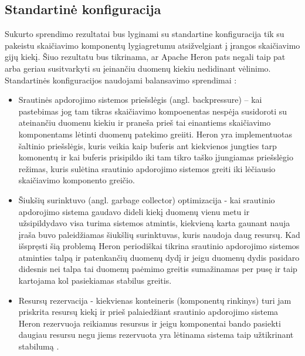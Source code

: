 \documentclass{VUMIFPSbakalaurinis}
\begin{document}
\subsection{Standartinė konfiguracija}
Sukurto sprendimo rezultatai bus lyginami su standartine konfiguracija tik su pakeistu skaičiavimo komponentų lygiagretumu atsižvelgiant į įrangos skaičiavimo gijų kiekį. Šiuo rezultatu bus tikrinama, ar Apache Heron pats negali taip pat arba geriau susitvarkyti su įeinančiu duomenų kiekiu nedidinant vėlinimo. Standartinės konfiguracijos naudojami balansavimo sprendimai \cite{twitterHeron}:
\begin{itemize}
    \item Srautinės apdorojimo sistemos priešslėgis (angl. backpressure) – kai pastebimas jog tam tikras skaičiavimo kompoenentas nespėja susidoroti su ateinančiu duomenu kiekiu ir praneša prieš tai einantiems skaičiavimo komponentams lėtinti duomenų patekimo greiiti. Heron yra implementuotas šaltinio priešslėgis, kuris veikia kaip buferis ant kiekvienos jungties tarp komonentų ir kai buferis prisipildo iki tam tikro taško įjungiamas priešslėgio režimas, kuris sulėtina srautinio apdorojimo sistemos greiti iki lėčiausio skaičiavimo komponento greičio. 
    \item Šiukšių surinktuvo (angl. garbage collector) optimizacija - kai srautinio apdorojimo sistema gaudavo dideli kiekį duomenų vienu metu ir užsipildydavo visa turima sistemos atmintis, kiekvieną karta gaunant nauja įraša buvo paleidžiamas šiukšlių surinktuvas, kuris naudoja daug resursų. Kad išspręsti šią problemą Heron periodiškai tikrina srautinio apdorojimo sistemos atminties talpą ir patenkančių duomenų dydį ir jeigu duomenų dydis pasidaro didesnis nei talpa tai duomenų paėmimo greitis sumažinamas per pusę ir taip kartojama kol pasiekiamas stabilus greitis. 
    \item Resursų rezervacija - kiekvienas konteineris (komponentų rinkinys) turi jam priskrita resursų kiekį ir prieš palaiedžiant srautinio apdorojimo sistema Heron rezervuoja reikiamus resursus ir jeigu komponentai bando pasiekti daugiau resursu negu jiems rezervuota yra lėtinama sistema taip užtikrinant stabilumą \cite{fu2015streaming}.  
\end{itemize}
\end{document}
